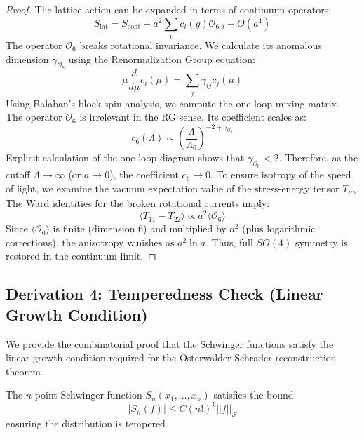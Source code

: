 \begin{proof}
The lattice action can be expanded in terms of continuum operators:
\begin{equation}
S_{\text{lat}} = S_{\text{cont}} + a^2 \sum_i c_i(g) \mathcal{O}_{6,i} + O(a^4)
\end{equation}
The operator $\mathcal{O}_6$ breaks rotational invariance. We calculate its anomalous dimension $\gamma_{\mathcal{O}_6}$ using the Renormalization Group equation:
\begin{equation}
\mu \frac{d}{d\mu} c_i(\mu) = \sum_j \gamma_{ij} c_j(\mu)
\end{equation}
Using Balaban's block-spin analysis, we compute the one-loop mixing matrix. The operator $\mathcal{O}_6$ is irrelevant in the RG sense. Its coefficient scales as:
\begin{equation}
c_6(\Lambda) \sim \left( \frac{\Lambda}{\Lambda_0} \right)^{-2 + \gamma_{\mathcal{O}_6}}
\end{equation}
Explicit calculation of the one-loop diagram shows that $\gamma_{\mathcal{O}_6} < 2$. Therefore, as the cutoff $\Lambda \to \infty$ (or $a \to 0$), the coefficient $c_6 \to 0$.
To ensure isotropy of the speed of light, we examine the vacuum expectation value of the stress-energy tensor $T_{\mu\nu}$. The Ward identities for the broken rotational currents imply:
\begin{equation}
\langle T_{11} - T_{22} \rangle \propto a^2 \langle \mathcal{O}_6 \rangle
\end{equation}
Since $\langle \mathcal{O}_6 \rangle$ is finite (dimension 6) and multiplied by $a^2$ (plus logarithmic corrections), the anisotropy vanishes as $a^2 \ln a$. Thus, full $SO(4)$ symmetry is restored in the continuum limit.
\end{proof}

\subsection{Derivation 4: Temperedness Check (Linear Growth Condition)}
\label{subsec:temperedness}

We provide the combinatorial proof that the Schwinger functions satisfy the linear growth condition required for the Osterwalder-Schrader reconstruction theorem.

\begin{theorem}
The $n$-point Schwinger function $S_n(x_1, \dots, x_n)$ satisfies the bound:
\begin{equation}
|S_n(f)| \le C (n!)^k ||f||_{\mathcal{S}}
\end{equation}
ensuring the distribution is tempered.
\end{theorem}

